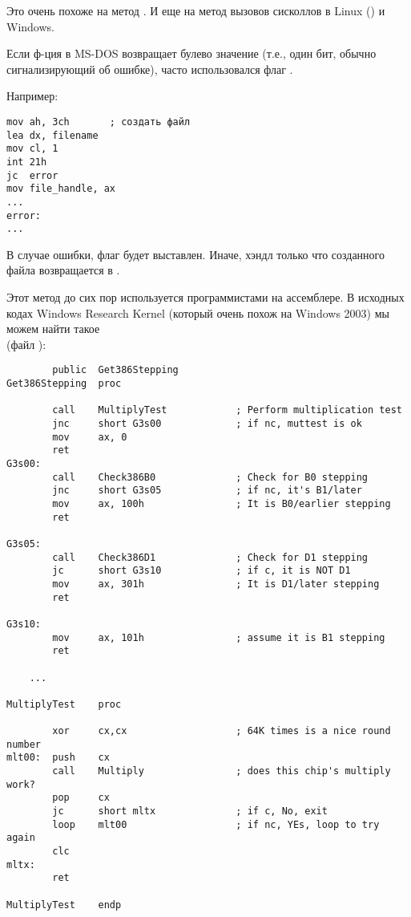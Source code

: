 Это очень похоже на метод .
И еще на метод вызовов сисколлов в Linux () и Windows.

Если ф-ция в MS-DOS возвращает булево значение (т.е., один бит, обычно сигнализирующий об ошибке),
часто использовался флаг .

Например:

\begin{lstlisting}
mov ah, 3ch       ; создать файл
lea dx, filename
mov cl, 1
int 21h
jc  error
mov file_handle, ax
...
error:
...
\end{lstlisting}

В случае ошибки, флаг  будет выставлен.
Иначе, хэндл только что созданного файла возвращается в .

Этот метод до сих пор используется программистами на ассемблере.
В исходных кодах Windows Research Kernel (который очень похож на Windows 2003) мы можем найти такое\\
(файл ):

\begin{lstlisting}
        public  Get386Stepping
Get386Stepping  proc

        call    MultiplyTest            ; Perform multiplication test
        jnc     short G3s00             ; if nc, muttest is ok
        mov     ax, 0
        ret
G3s00:
        call    Check386B0              ; Check for B0 stepping
        jnc     short G3s05             ; if nc, it's B1/later
        mov     ax, 100h                ; It is B0/earlier stepping
        ret

G3s05:
        call    Check386D1              ; Check for D1 stepping
        jc      short G3s10             ; if c, it is NOT D1
        mov     ax, 301h                ; It is D1/later stepping
        ret

G3s10:
        mov     ax, 101h                ; assume it is B1 stepping
        ret

	...

MultiplyTest    proc

        xor     cx,cx                   ; 64K times is a nice round number
mlt00:  push    cx
        call    Multiply                ; does this chip's multiply work?
        pop     cx
        jc      short mltx              ; if c, No, exit
        loop    mlt00                   ; if nc, YEs, loop to try again
        clc
mltx:
        ret

MultiplyTest    endp
\end{lstlisting}


